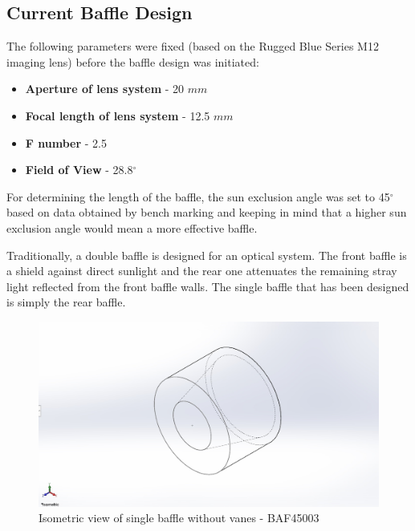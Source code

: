 \documentclass[../../main.tex]{subfiles}
\begin{document}
\subsection{Current Baffle Design}
The following parameters were fixed (based on the Rugged Blue Series M12 imaging lens) before the baffle design was initiated:
\begin{itemize}
    \item \textbf{Aperture of lens system} - 20 $mm$
    \item \textbf{Focal length of lens system} - 12.5 $mm$
    \item \textbf{F number} - 2.5
    \item \textbf{Field of View} - 28.8$^\circ$
\end{itemize}
\par
For determining the length of the baffle, the sun exclusion angle was set to 45$^\circ$ based on data obtained by bench marking and keeping in mind that a higher sun exclusion angle would mean a more effective baffle.
\par
Traditionally, a double baffle is designed for an optical system. The front baffle is a shield against direct sunlight and the rear one attenuates the remaining stray light reflected from the front baffle walls. The single baffle that has been designed is simply the rear baffle. 
\begin{figure}[H]
    \centering
    \includegraphics[width=\textwidth]{Figures/Instrumentation/single_baffle.jpg}
    \caption{Isometric view of single baffle without vanes - BAF45003}
    \label{fig:8.3}
\end{figure}

\end{document}
